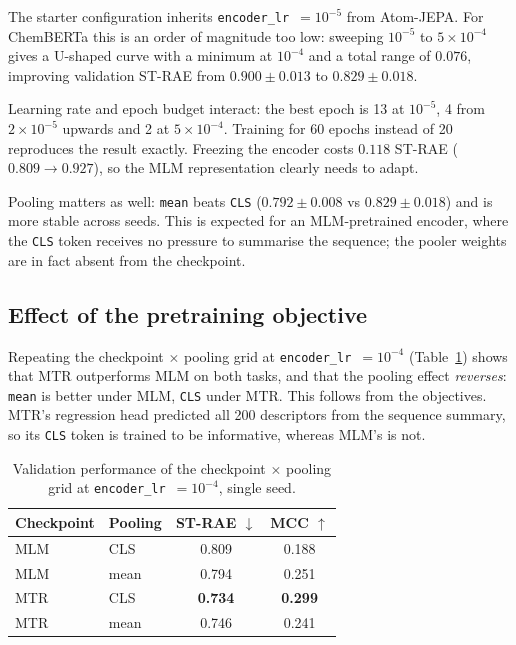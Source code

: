 \documentclass[10pt,twocolumn,a4paper]{article}
\begin{document}
The starter configuration inherits \texttt{encoder\_lr}~$=10^{-5}$ from
Atom-JEPA. For ChemBERTa this is an order of magnitude too low: sweeping
$10^{-5}$ to $5\times10^{-4}$ gives a U-shaped curve with a minimum at
$10^{-4}$ and a total range of $0.076$, improving validation ST-RAE from
$0.900 \pm 0.013$ to $0.829 \pm 0.018$.

Learning rate and epoch budget interact: the best epoch is 13 at
$10^{-5}$, 4 from $2\times10^{-5}$ upwards and 2 at $5\times10^{-4}$.
Training for 60 epochs instead of 20 reproduces the result exactly.
Freezing the encoder costs $0.118$ ST-RAE ($0.809 \rightarrow 0.927$),
so the MLM representation clearly needs to adapt.

Pooling matters as well: \texttt{mean} beats \texttt{CLS}
($0.792 \pm 0.008$ vs $0.829 \pm 0.018$) and is more stable across
seeds. This is expected for an MLM-pretrained encoder, where the
\texttt{CLS} token receives no pressure to summarise the sequence; the
pooler weights are in fact absent from the checkpoint.

\subsection{Effect of the pretraining objective}

Repeating the checkpoint $\times$ pooling grid at
\texttt{encoder\_lr}~$=10^{-4}$ (Table~\ref{tab:grid}) shows that MTR
outperforms MLM on both tasks, and that the pooling effect
\emph{reverses}: \texttt{mean} is better under MLM, \texttt{CLS} under
MTR. This follows from the objectives. MTR's regression head predicted
all 200 descriptors from the sequence summary, so its \texttt{CLS}
token is trained to be informative, whereas MLM's is not.

\begin{table}[t]
  \centering
  \caption{Validation performance of the checkpoint $\times$ pooling
  grid at \texttt{encoder\_lr}~$=10^{-4}$, single seed.}
  \label{tab:grid}
  \begin{tabular}{llcc}
    \toprule
    Checkpoint & Pooling & ST-RAE $\downarrow$ & MCC $\uparrow$ \\
    \midrule
    MLM & CLS  & 0.809 & 0.188 \\
    MLM & mean & 0.794 & 0.251 \\
    MTR & CLS  & \textbf{0.734} & \textbf{0.299} \\
    MTR & mean & 0.746 & 0.241 \\
    \bottomrule
  \end{tabular}
\end{table}
\end{document}
